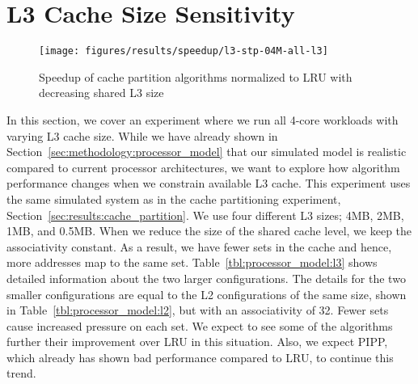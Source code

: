 \section{L3 Cache Size Sensitivity}
\label{sec:results:l3size_sensitivity}


\begin{figure}[th]
    \centering
    \texttt{[image: figures/results/speedup/l3-stp-04M-all-l3]}
    \caption{Speedup of cache partition algorithms normalized to LRU with decreasing shared L3 size}
    \label{fig:results:l3}
\end{figure}

In this section, we cover an experiment where we run all 4-core workloads with varying L3 cache size.
While we have already shown in Section~\ref{sec:methodology:processor_model} that our simulated model is realistic compared to current processor architectures, we want to explore how algorithm performance changes when we constrain available L3 cache.
This experiment uses the same simulated system as in the cache partitioning experiment, Section~\ref{sec:results:cache_partition}.
We use four different L3 sizes; 4MB, 2MB, 1MB, and 0.5MB.
When we reduce the size of the shared cache level, we keep the associativity constant.
As a result, we have fewer sets in the cache and hence, more addresses map to the same set.
Table~\ref{tbl:processor_model:l3} shows detailed information about the two larger configurations.
The details for the two smaller configurations are equal to the L2 configurations of the same size, shown in Table~\ref{tbl:processor_model:l2}, but with an associativity of 32.
Fewer sets cause increased pressure on each set.
We expect to see some of the algorithms further their improvement over LRU in this situation.
Also, we expect PIPP, which already has shown bad performance compared to LRU, to continue this trend.

